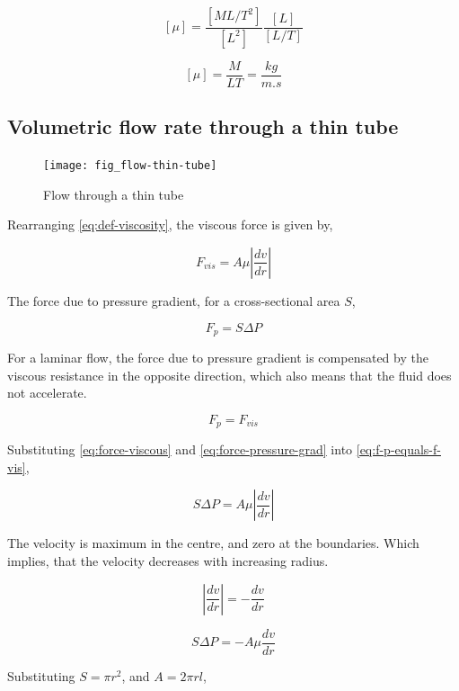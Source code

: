 	\[ [\mu] = \frac{[ML/T^2]}{[L^2]} \frac{[L]}{[L/T]} \]
	
	\begin{equation} \label{eq:diamension-mu}
		[\mu] = \frac{M}{LT} = \frac{kg}{m.s}
	\end{equation}


\subsection{Volumetric flow rate through a thin tube}
	
	\begin{figure}[H]
		\texttt{[image: fig\_flow-thin-tube]}
		\caption{Flow through a thin tube}
		\label{fig_flow-thin-tube}
	\end{figure}
	
	Rearranging \ref{eq:def-viscosity}, the viscous force is given by,
	
	\begin{equation} \label{eq:force-viscous}
		F_{vis} = A \mu \left| \frac{dv}{dr} \right|
	\end{equation}
	
	The force due to pressure gradient, for a cross-sectional area $S$,
	
	\begin{equation} \label{eq:force-pressure-grad}
		F_{p} = S \Delta P
	\end{equation}
	
	For a laminar flow, the force due to pressure gradient is compensated by the viscous resistance in the opposite direction, which also means that the fluid does not accelerate.
	
	\begin{equation} \label{eq:f-p-equals-f-vis}
		F_{p} = F_{vis}
	\end{equation}
	
	Substituting \ref{eq:force-viscous} and \ref{eq:force-pressure-grad} into \ref{eq:f-p-equals-f-vis},
	
	\[ S \Delta P = A \mu \left| \frac{dv}{dr} \right| \]
	
	The velocity is maximum in the centre, and zero at the boundaries. Which implies, that the velocity decreases with increasing radius.
	
	\[ \left| \frac{dv}{dr} \right| = -\frac{dv}{dr} \]
	
	\[ S \Delta P = -A \mu \frac{dv}{dr} \]
	
	Substituting $S = \pi r^2$, and $A = 2 \pi r l$,
	

